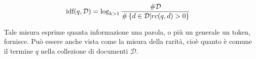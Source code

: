 \begin{definizione}\label{def:idf}
	$$
	\text{idf}(q, \mathcal{D}) = \log_{k>1}{
		\frac{\#\mathcal{D}}{
			\#
			\left\{
			d \in \mathcal{D} \middle \lvert rc(q,d) > 0
			\right\} 
		}
	}
	$$
	
	Tale misura esprime quanta informazione una parola, o più un generale un token, fornisce.
	Può essere anche vista come la misura della rarità, cioè quanto è comune il termine $q$
	nella collezione di documenti $\mathcal{D}$.
\end{definizione}





